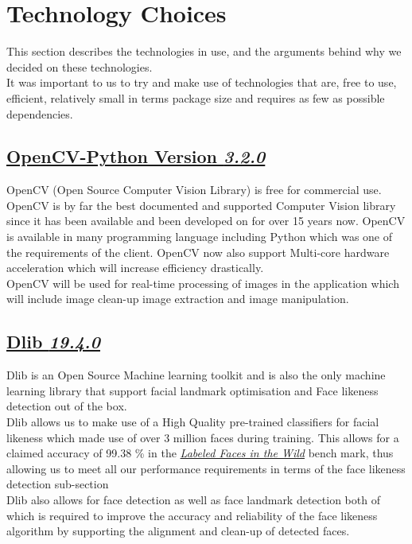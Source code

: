 \documentclass{article}
\begin{document}
		\section{Technology Choices}
		This section describes the technologies in use, and the
		arguments behind why we decided on these technologies.\\
		It was important to us to try and make use of technologies that are,
		free to use, efficient, relatively small in terms package size and
		requires as few as possible dependencies. 
		\subsection{
		\href{http://docs.opencv.org/3.0-beta/doc/py_tutorials/py_tutorials.html}			{OpenCV-Python Version \textit{3.2.0}}}
		OpenCV (Open Source Computer Vision Library) is free for commercial use.
		OpenCV is by far the best documented and supported Computer Vision library
		since it has been available and been developed on for over 15 years now.
		OpenCV is available in many programming language 
		including Python which was one of the requirements of the client.
		OpenCV now also support Multi-core hardware acceleration which will
		increase efficiency drastically. \\
		
		\noindent
		OpenCV will be used for real-time processing of images in the application
		which will include image clean-up image extraction and image manipulation.
	
		\subsection{\href{http://dlib.net/}{Dlib \textit{19.4.0}}}
		Dlib is an Open Source Machine learning toolkit and is also
		the only machine learning library that support facial landmark
		optimisation and Face likeness detection out of the box.\\ 
		
		\noindent
		Dlib allows us to make use of a High Quality pre-trained classifiers
		for facial likeness which made use of over 3 million faces 
		during training. This allows for a claimed accuracy of 99.38 \% in the
		\href{http://vis-www.cs.umass.edu/lfw/}
		{\textit{Labeled Faces in the Wild}}
		bench mark, thus allowing us to meet all our performance requirements
		in terms of the face likeness detection sub-section\\
		
		\noindent
		Dlib also allows for face detection as well as face landmark 
		detection both of which is required to improve the
		accuracy and reliability of the face likeness algorithm by supporting
		the alignment and clean-up of detected faces.
		
\end{document}
